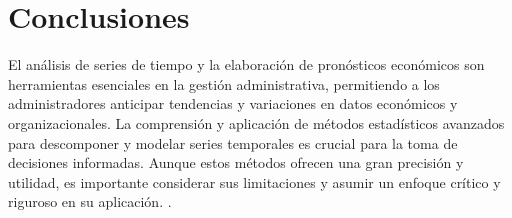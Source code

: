 {\clearpage
\section{Conclusiones}
El análisis de series de tiempo y la elaboración de pronósticos económicos son herramientas esenciales en la gestión administrativa, permitiendo a los administradores anticipar tendencias y variaciones en datos económicos y organizacionales. La comprensión y aplicación de métodos estadísticos avanzados para descomponer y modelar series temporales es crucial para la toma de decisiones informadas. Aunque estos métodos ofrecen una gran precisión y utilidad, es importante considerar sus limitaciones y asumir un enfoque crítico y riguroso en su aplicación. \citep{anderson2012,lind2012,wackerly2010,diazRodriguez2022}.
}

